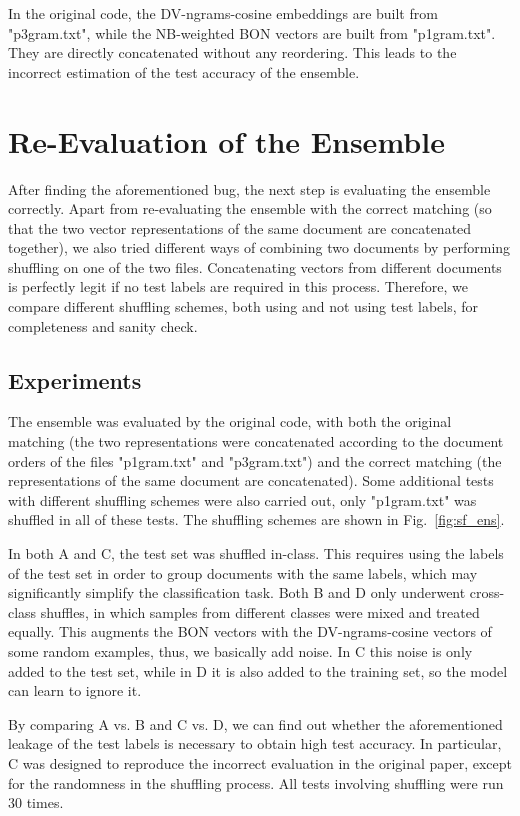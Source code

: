 \documentclass[11pt]{article}
\begin{document}
In the original code, the DV-ngrams-cosine embeddings are built from "p3gram.txt", while the NB-weighted BON vectors are built from "p1gram.txt". They are directly concatenated without any reordering. This leads to the incorrect estimation of the test accuracy of the ensemble.

\section{Re-Evaluation of the Ensemble}
\label{sec:appendix_reev}
After finding the aforementioned bug, the next step is evaluating the ensemble correctly. Apart from re-evaluating the ensemble with the correct matching (so that the two vector representations of the same document are concatenated together), we also tried different ways of combining two documents by performing shuffling on one of the two files. Concatenating vectors from different documents is perfectly legit if no test labels are required in this process. Therefore, we compare different shuffling schemes, both using and not using test labels, for completeness and sanity check.

\subsection{Experiments}
The ensemble was evaluated by the original code, with both the original matching (the two representations were concatenated according to the document orders of the files "p1gram.txt" and "p3gram.txt") and the correct matching (the representations of the same document are concatenated). Some additional tests with different shuffling schemes were also carried out, only "p1gram.txt" was shuffled in all of these tests. The shuffling schemes are shown in Fig.~\ref{fig:sf_ens}. 

In both A and C, the test set was shuffled in-class. This requires using the labels of the test set in order to group documents with the same labels, which may significantly simplify the classification task. Both B and D only underwent cross-class shuffles, in which samples from different classes were mixed and treated equally. This augments the BON vectors with the DV-ngrams-cosine vectors of some random examples, thus, we basically add noise. In C this noise is only added to the test set, while in D it is also added to the training set, so the model can learn to ignore it. 

By comparing A vs. B and C vs. D, we can find out whether the aforementioned leakage of the test labels is necessary to obtain high test accuracy. In particular, C was designed to reproduce the incorrect evaluation in the original paper, except for the randomness in the shuffling process. All tests involving shuffling were run 30 times. 
\end{document}

